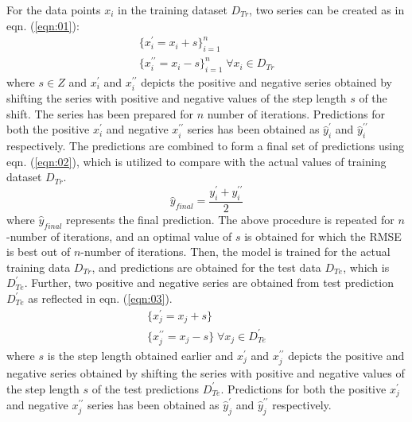 For the data points $x_i$ in the training dataset $D_{Tr}$, two series can be created as in eqn. (\ref{eqn:01}):
\begin{equation}
\begin{aligned}
\label{eqn:01}
\{x_i^{\prime}=x_i+s\}_{i=1}^n \\
\{x_i^{\prime\prime}=x_i-s\}_{i=1}^n \; \forall x_i \in D_{Tr}
\end{aligned}
\end{equation}
where $s \in Z$ and $x_i^{\prime}$ and $x_{i}^{\prime\prime}$ depicts the positive and negative series obtained by shifting the series with positive and negative values of the step length $s$ of the shift. The series has been prepared for $n$ number of iterations.
Predictions for both the positive $x_i^{\prime}$ and negative $x_i^{\prime\prime}$ series has been obtained as $\hat{y}_i^{\prime}$ and $ \hat{y}_i^{\prime\prime}$ respectively.
The predictions are combined to form a final set of predictions using eqn. (\ref{eqn:02}), which is utilized to compare with the actual values of training dataset $D_{Tr}$.
\begin{equation}
\label{eqn:02}
\hat{y}_{final}=\frac{y_i^{\prime}+y_i^{\prime\prime}}{2}
\end{equation}
where $\hat{y}_{final}$ represents the final prediction. The above procedure is repeated for $n$-number of iterations, and an optimal value of $s$ is obtained for which the RMSE is best out of $n$-number of iterations.
Then, the model is trained for the actual training data $D_{Tr}$, and predictions are obtained for the test data $D_{Te}$, which is $D_{Te}^{\prime}$. Further, two positive and negative series are obtained from test prediction $D_{Te}^{\prime}$ as reflected in eqn. (\ref{eqn:03}).
\begin{equation}
\begin{aligned}
\label{eqn:03}
\{x_j^{\prime}=x_j+s\} \\
\{x_j^{\prime\prime}=x_j-s\} \; \forall x_j \in D_{Te}^{\prime}
\end{aligned}
\end{equation}
where $s$ is the step length obtained earlier and $x_j^{\prime}$ and $x_{j}^{\prime\prime}$ depicts the positive and negative series obtained by shifting the series with positive and negative values of the step length $s$ of the test predictions $ D_{Te}^{\prime}$.
Predictions for both the positive $x_j^{\prime}$ and negative $x_j^{\prime\prime}$ series has been obtained as $ \hat{y}_j^{\prime}$ and $ \hat{y}_j^{\prime\prime}$ respectively.

